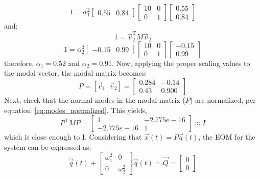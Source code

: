 \documentclass[12pt,letter]{article}
\begin{document}
\begin{example}
	\begin{equation}
	1 = \alpha_1^2 \begin{bmatrix} 0.55 &  0.84 \end{bmatrix} \begin{bmatrix} 10 & 0 \\    0  & 1 \end{bmatrix}  \begin{bmatrix} 0.55 \\  0.84 \end{bmatrix}
	\end{equation}
	and:
	\begin{equation}
	1 = \vec{v}_2^\text{T} M \vec{v}_2 
	\end{equation}
	\begin{equation}
	1 = \alpha_2^2 \begin{bmatrix} -0.15 &  0.99 \end{bmatrix} \begin{bmatrix} 10 & 0 \\    0  & 1 \end{bmatrix}  \begin{bmatrix} -0.15 \\  0.99 \end{bmatrix}
	\end{equation}
	therefore, $\alpha_1=0.52$ and $\alpha_2=0.91$. Now, applying the proper scaling values to the modal vector, the modal matrix becomes:
	\begin{equation}
	P = [ \vec{v}_1 \; \; \vec{v}_2 ] = \begin{bmatrix} 0.284 & -0.14 \\    0.43  & 0.900 \end{bmatrix}
	\end{equation}
	Next, check that the normal modes in the modal matrix ($P$) are normalized, per equation~\ref{eq:modes_normalized}. This yields,
	\begin{equation}
	P^{\text{T}} M P = \begin{bmatrix} 1 & -2.775e-16 \\   -2.775e-16 & 1 \end{bmatrix} \approx I
	\end{equation}
	which is close enough to I. Considering that $\vec{x}(t) = P\vec{q}(t)$, the EOM for the system can be expressed as:
	\begin{equation}
	\ddot{\vec{q}}(t) + \begin{bmatrix} \omega_1^2 & 0 \\    0  & \omega_2^2 \end{bmatrix} \vec{q} (t) = \vec{Q} = \begin{bmatrix} 0 \\  0  \end{bmatrix} 

\end{equation}
\end{example}
\end{document}
